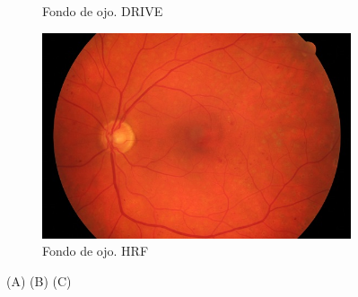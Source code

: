\begin{figure}[H]
\begin{subfigure}[b]{0.3\textwidth}
        \caption{Fondo de ojo. DRIVE}
        \label{fig:Drive}
    \end{subfigure}
    \begin{subfigure}[b]{0.3\textwidth}
				\centering
        \includegraphics[height=\textwidth]{./Figures/imagesHRF}
        \caption{Fondo de ojo. HRF}
        \label{fig:Hrf}
    \end{subfigure}        
    \label{fig:Imagenes de fondo de ojo}
    \caption{(A) (B) (C)}
\end{figure}


